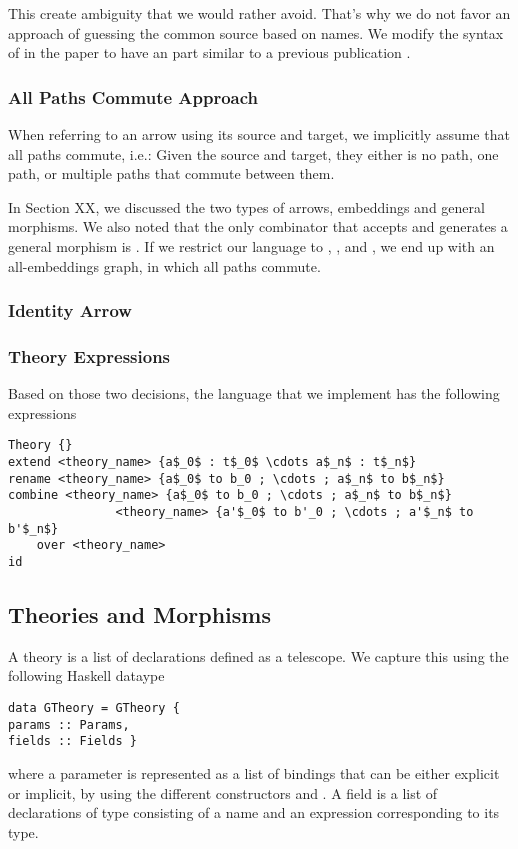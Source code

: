 This create ambiguity that we would rather avoid. That's why we do not favor an approach of guessing the common source based on names. We modify the syntax of  in the paper to have an  part similar to a previous publication \cite{CaretteOConnorTPC}. 

\subsubsection{All Paths Commute Approach} 
When referring to an arrow using its source and target, we implicitly assume that all paths commute, i.e.: Given the source and target, they either is no path, one path, or multiple paths that commute between them. 

In Section XX, we discussed the two types of arrows, embeddings and general morphisms. We also noted that the only combinator that accepts and generates a general morphism is . If we restrict our language to , , and , we end up with an all-embeddings graph, in which all paths commute.

\subsubsection{Identity Arrow}

\subsubsection{Theory Expressions}
Based on those two decisions, the language that we implement has the following expressions
\begin{lstlisting}
Theory {}
extend <theory_name> {a$_0$ : t$_0$ \cdots a$_n$ : t$_n$}
rename <theory_name> {a$_0$ to b_0 ; \cdots ; a$_n$ to b$_n$}
combine <theory_name> {a$_0$ to b_0 ; \cdots ; a$_n$ to b$_n$}
               <theory_name> {a'$_0$ to b'_0 ; \cdots ; a'$_n$ to b'$_n$}
    over <theory_name>
id     
\end{lstlisting} 


\subsection{Theories and Morphisms}
A theory is a list of declarations defined as a telescope. We capture this using the following Haskell dataype 
\begin{verbatim}
data GTheory = GTheory {
params :: Params,
fields :: Fields }
\end{verbatim}
where a parameter is represented as a list of bindings that can be either explicit or implicit, by using the different  constructors  and . A field is a list of declarations of type 
 consisting of a name and an expression corresponding to its type. 

